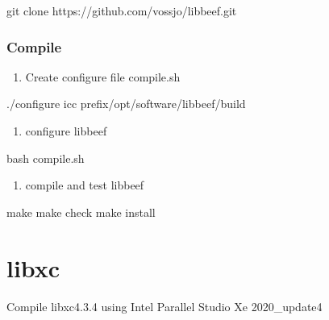 \documentclass[a4paper,12pt,english]{sphinxmanual}
\begin{document}
\begin{sphinxVerbatim}[commandchars=\\\{\}]
git clone https://github.com/vossjo/libbeef.git
\end{sphinxVerbatim}


\subsubsection{Compile}
\label{\detokenize{compile/libbeef:compile}}\begin{enumerate}
%
\item {} 
\sphinxAtStartPar
Create configure file compile.sh

\end{enumerate}

\begin{sphinxVerbatim}[commandchars=\\\{\}]
./configure icc 
    \PYGZhy{}\PYGZhy{}prefix/opt/software/libbeef/build 
\end{sphinxVerbatim}
\begin{enumerate}
%
\setcounter{enumi}{1}
\item {} 
\sphinxAtStartPar
configure libbeef

\end{enumerate}

\begin{sphinxVerbatim}[commandchars=\\\{\}]
bash compile.sh
\end{sphinxVerbatim}
\begin{enumerate}
%
\setcounter{enumi}{2}
\item {} 
\sphinxAtStartPar
compile and test libbeef

\end{enumerate}

\begin{sphinxVerbatim}[commandchars=\\\{\}]
make  make check  make install
\end{sphinxVerbatim}


\section{libxc}
\label{\detokenize{compile:libxc}}
\sphinxAtStartPar
Compile libxc\sphinxhyphen{}4.3.4 using Intel Parallel Studio Xe 2020\_update4
\end{document}
